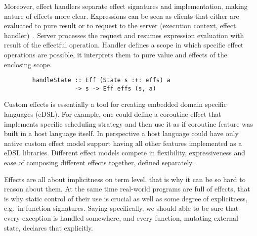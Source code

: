 \documentclass[conference]{IEEEtran}
\begin{document}
    Moreover, effect handlers separate effect signatures and implementation, making nature of effects more clear.
    Expressions can be seen as clients that either are evaluated to pure result or to request to the server (execution context, effect handler)~\cite{extensible-effects}.
    Server processes the request and resumes expression evaluation with result of the effectful operation.
    Handler defines a scope in which specific effect operations are possible, it interprets them to pure value and effects of the enclosing scope.
    \begin{verbatim}
        handleState :: Eff (State s :+: effs) a
                    -> s -> Eff effs (s, a)
    \end{verbatim}

    Custom effects is essentially a tool for creating embedded domain specific languages (eDSL).
    For example, one could define a coroutine effect that implements specific scheduling strategy and then use it as if coroutine feature was built in a host language itself.
    In perspective a host language could have only native custom effect model support having all other features implemented as a eDSL libraries.
    Different effect models compete in flexibility, expressiveness and ease of composing different effects together, defined separately~\cite{transformers, extensible-effects, hoe}.




    Effects are all about implicitness on term level, that is why it can be so hard to reason about them.
    At the same time real-world programs are full of effects, that is why static control of their use is crucial as well as some degree of explicitness, e.g.\ in function signatures.
    Saying specifically, we should able to be sure that every exception is handled somewhere, and every function, mutating external state, declares that explicitly.
\end{document}
